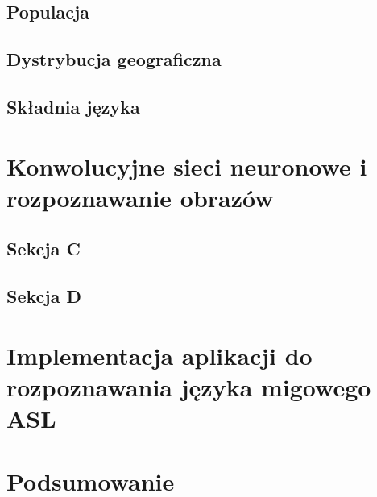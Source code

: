 \documentclass[a4paper,12pt,oneside]{book} %
\begin{document}
\section{Populacja}
\section{Dystrybucja geograficzna}
\section{Składnia języka}


\chapter{Konwolucyjne sieci neuronowe i rozpoznawanie obrazów}

\section{Sekcja C}
\section{Sekcja D}

\chapter{Implementacja aplikacji do rozpoznawania języka migowego ASL}

\chapter{Podsumowanie}


\listoftables{} %

\listoffigures{} %

\listofcodes
{}



\end{document}
